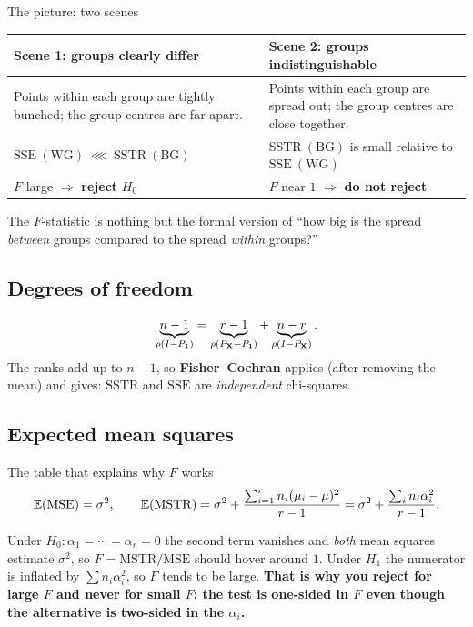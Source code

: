 \documentclass[11pt]{article}
\begin{document}
\begin{idea}{The picture: two scenes}
\begin{center}
\begin{tabular}{@{}p{7.2cm}p{7.2cm}@{}}
\toprule
\textbf{Scene 1: groups clearly differ} & \textbf{Scene 2: groups indistinguishable}\\
\midrule
Points within each group are tightly bunched; the group centres are far apart. &
Points within each group are spread out; the group centres are close together.\\
$\mathrm{SSE}\ (\text{WG})\ \lll\ \mathrm{SSTR}\ (\text{BG})$ &
$\mathrm{SSTR}\ (\text{BG})$ is small relative to $\mathrm{SSE}\ (\text{WG})$\\
$F$ large $\Rightarrow$ \textbf{reject} $H_0$ & $F$ near $1$ $\Rightarrow$ \textbf{do not reject}\\
\bottomrule
\end{tabular}
\end{center}
The $F$-statistic is nothing but the formal version of ``how big is the spread
\emph{between} groups compared to the spread \emph{within} groups?''
\end{idea}

\subsection{Degrees of freedom}

\[
  \underbrace{n-1}_{\rho(I-P_{\mathbf{1}})}
  =\underbrace{r-1}_{\rho(P_{\mathbf{X}}-P_{\mathbf{1}})}
  +\underbrace{n-r}_{\rho(I-P_{\mathbf{X}})} .
\]
The ranks add up to $n-1$, so \textbf{Fisher--Cochran} applies (after removing the mean) and
gives: $\mathrm{SSTR}$ and $\mathrm{SSE}$ are \emph{independent} chi-squares.

\subsection{Expected mean squares}

\begin{idea}{The table that explains why $F$ works}
\[
  \mathbb{E}(\mathrm{MSE})=\sigma^2, \qquad
  \mathbb{E}(\mathrm{MSTR})=\sigma^2+\frac{\sum_{i=1}^r n_i(\mu_i-\mu)^2}{r-1}
  =\sigma^2+\frac{\sum_i n_i\alpha_i^2}{r-1} .
\]
\end{idea}

Under $H_0:\alpha_1=\cdots=\alpha_r=0$ the second term vanishes and \emph{both} mean squares
estimate $\sigma^2$, so $F=\mathrm{MSTR}/\mathrm{MSE}$ should hover around $1$. Under $H_1$ the
numerator is inflated by $\sum n_i\alpha_i^2$, so $F$ tends to be large. \textbf{That is why
you reject for large $F$ and never for small $F$: the test is one-sided in $F$ even though the
alternative is two-sided in the $\alpha_i$.}
\end{document}
